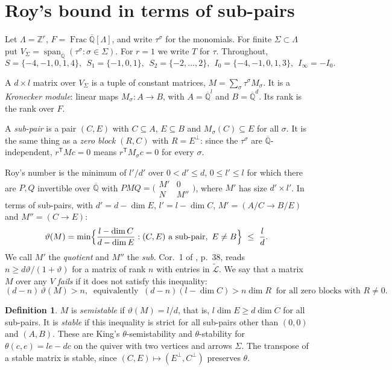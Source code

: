 \documentclass[11pt,a4paper]{article}
\theoremstyle{plain}
\theoremstyle{definition}
\newtheorem{definition}[lemma]{Definition}
\newcommand{\Z}{\mathbb{Z}}
\newcommand{\Qbar}{\overline{\mathbb{Q}}}
\newcommand{\Lt}{\widetilde{\mathcal{L}}}
\newcommand{\spn}{\operatorname{span}}
\newcommand{\vth}{\vartheta}
\newcommand{\Iz}{I_{0}}
\newcommand{\Ii}{I_{\infty}}
\begin{document}
\section{Roy's bound in terms of sub-pairs}\label{sec:roy}

Let $\Lambda=\Z^{r}$, $F=\operatorname{Frac}\Qbar[\Lambda]$, and write $\tau^{\sigma}$ for the monomials. For finite
$\Sigma\subset\Lambda$ put $V_{\Sigma}=\spn_{\Qbar}(\tau^{\sigma}:\sigma\in\Sigma)$. For $r=1$ we write $T$ for $\tau$. Throughout,
\[
  S=\{-4,-1,0,1,4\},\ \  S_{1}=\{-1,0,1\},\ \  S_{2}=\{-2,\dots,2\},\ \  \Iz=\{-4,-1,0,1,3\},\ \  \Ii=-\Iz.
\]

A $d\times l$ matrix over $V_{\Sigma}$ is a tuple of constant matrices, $M=\sum_{\sigma}\tau^{\sigma}M_{\sigma}$. It is a
\emph{Kronecker module}: linear maps $M_{\sigma}:A\to B$, with $A=\Qbar^{l}$ and $B=\Qbar^{d}$. Its rank is the rank over $F$.

A \emph{sub-pair} is a pair $(C,E)$ with $C\subseteq A$, $E\subseteq B$ and $M_{\sigma}(C)\subseteq E$ for all $\sigma$. It is the
same thing as a \emph{zero block} $(R,C)$ with $R=E^{\perp}$: since the $\tau^{\sigma}$ are $\Qbar$-independent, $r^{\mathsf T}Mc=0$
means $r^{\mathsf T}M_{\sigma}c=0$ for every $\sigma$.

Roy's number \cite[p.~37]{Roy92} is the minimum of $l'/d'$ over $0<d'\le d$, $0\le l'\le l$ for which there are
$P,Q$ invertible over $\Qbar$ with $PMQ=\bigl(\begin{smallmatrix}M'&0\\N&M''\end{smallmatrix}\bigr)$, where $M'$ has size $d'\times l'$.
In terms of sub-pairs, with $d'=d-\dim E$, $l'=l-\dim C$, $M'=(A/C\to B/E)$ and $M''=(C\to E)$:
\[
  \vth(M)=\min\Bigl\{\frac{l-\dim C}{d-\dim E}:(C,E)\text{ a sub-pair},\ E\neq B\Bigr\}\ \le\ \frac{l}{d}.
\]
We call $M'$ the \emph{quotient} and $M''$ the \emph{sub}. Cor.~1 of \cite{Roy92}, p.~38, reads $n\ge d\vth/(1+\vth)$ for a matrix
of rank $n$ with entries in $\Lt$. We say that a matrix $M$ over any $V$ \emph{fails} if it does not satisfy this inequality:
\[
  (d-n)\,\vth(M)>n,\ \text{ equivalently }\ (d-n)(l-\dim C)>n\dim R\ \text{ for all zero blocks with }R\neq0. \tag{$\star$}
\]

\begin{definition}
$M$ is \emph{semistable} if $\vth(M)=l/d$, that is, $l\dim E\ge d\dim C$ for all sub-pairs. It is \emph{stable} if this inequality is
strict for all sub-pairs other than $(0,0)$ and $(A,B)$. These are King's $\theta$-semistability and $\theta$-stability
\cite[Def.~1.1, p.~516]{Kin94} for $\theta(c,e)=le-dc$ on the quiver with two vertices and arrows $\Sigma$. The transpose of a stable matrix is
stable, since $(C,E)\mapsto(E^{\perp},C^{\perp})$ preserves $\theta$.
\end{definition}
\end{document}
